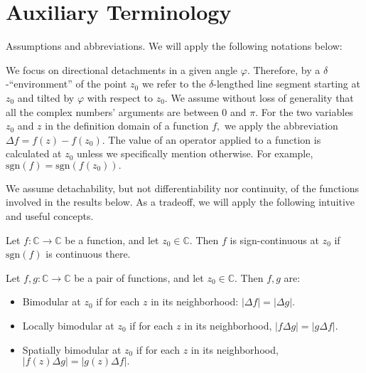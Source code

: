 \documentclass[11pt]{book}
\begin{document}
\section{Auxiliary Terminology}

Assumptions and abbreviations. We will apply the following notations below:

We focus on directional detachments in a given angle $\varphi.$ Therefore, by a $\delta$-“environment” of the point $z_{0}$ we refer to the $\delta$-lengthed line segment starting at $z_{0}$ and tilted by $\varphi$ with respect to $z_{0}.$
We assume without loss of generality that all the complex numbers' arguments are between $0$ and $\pi.$
For the two variables $z_{0}$ and $z$ in the definition domain of a function $f,$ we apply the abbreviation $\Delta f=f\left(z\right)-f\left(z_{0}\right).$
The value of an operator applied to a function is calculated at $z_{0}$ unless we specifically mention otherwise. For example, $\text{sgn}\left(f\right)=\text{sgn}\left(f\left(z_{0}\right)\right).$

We assume detachability, but not differentiability nor continuity, of the functions involved in the results below. As a tradeoff, we will apply the following intuitive and useful concepts.

\begin{definition}
Let $f:\mathbb{C}\longrightarrow\mathbb{C}$ be a function, and let $z_{0}\in\mathbb{C}.$ Then $f$ is sign-continuous at $z_{0}$ if $\text{sgn}\left(f\right)$ is continuous there.
\end{definition}

\begin{definition}[Bimodularity]
Let $f,g:\mathbb{C}\longrightarrow\mathbb{C}$ be a pair of functions, and let $z_{0}\in\mathbb{C}.$ Then $f,g$ are:

\begin{itemize}
\item Bimodular at $z_{0}$ if for each $z$ in its neighborhood: $\left|\Delta f\right|=\left|\Delta g\right|.$
\item Locally bimodular at $z_{0}$ if for each $z$ in its neighborhood, $\left|f\Delta g\right|=\left|g\Delta f\right|.$
\item Spatially bimodular at $z_{0} $ if for each $z$ in its neighborhood, $\left|f\left(z\right)\Delta g\right|=\left|g\left(z\right)\Delta f\right|.$
\end{itemize}
\end{definition}
\end{document}
